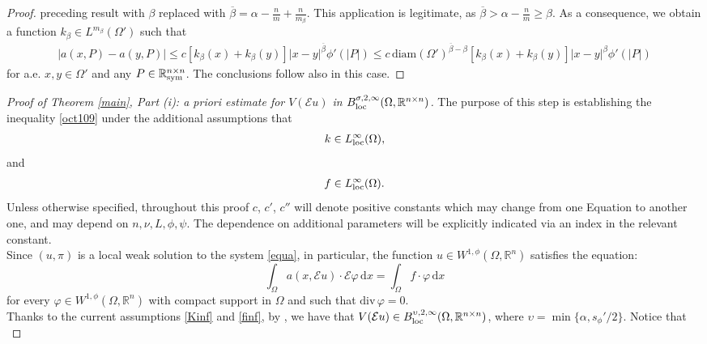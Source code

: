 \documentclass[leqno,11pt]{amsart}%
\numberwithin{equation}{section}
\newcommand{\dive}{\mathrm{div}\,}
\def\real{\mathbb R}
\def\R{\mathbb R}
\def\d{\mathrm{d}}
\def\E{\mathcal{E}}
\def\Sym{\real^{n\times n}_{\textup{sym}}}
\theoremstyle{definition}
\numberwithin{equation}{section}
\begin{document}
\begin{proof}
preceding result with $\beta$ replaced with $\overline\beta=\alpha-\frac{n}{
  m}+\frac{n}{ m_\beta}$. This application is legitimate, as 
  $\overline\beta> \alpha-\frac{n}{
  m}\ge\beta$. As a consequence, we obtain a function $k_\beta\in L^{
  m_\beta}(\Omega')$ such that
\begin{align*}
  |a(x,P)-a(y,P)|
  \le
  c [k_\beta(x)+k_\beta(y)]|x-y|^{\overline \beta}\phi'(|P|)\le c\,\mathrm{diam}(\Omega')^{\overline \beta -\beta}[k_\beta(x)+k_\beta(y)]|x-y|^{\beta}\phi'(|P|)
\end{align*}
for a.e. $x,y\in\Omega'$ and any $P\in\Sym$. The conclusions follow also in this case.
\end{proof}


\begin{proof}
    [Proof of Theorem \ref{main}, Part (i):  a priori estimate for $V(\E u)$ in $B^{\sigma, 2, \infty}_{\rm loc}(\Omega, \mathbb R^{n\times n})$] The purpose of this step is establishing the inequality \eqref{oct109} under the additional assumptions that 
    \begin{align}
        \label{Kinf}
        k\in L^\infty_{\rm loc}(\Omega),
    \end{align}
    and
        \begin{align}
        \label{finf}
        f\in L^\infty_{\rm loc}(\Omega).
    \end{align}
    Unless otherwise specified, throughout this proof $c$, $c'$, $c''$ will denote positive constants which  may change from one Equation to another one, and may depend on $n, \nu, L, \phi, \psi$.
  The dependence on additional parameters will be explicitly indicated via an index in the relevant constant.
 \\
    Since $(u,\pi)$ is a local weak solution to the system \eqref{equa}, in particular, the function $u\in
  W^{1,\phi}(\Omega,\R^n)$ satisfies the equation:
  \begin{equation}
    \label{equa-div-free}
    \int_\Omega  a(x,\E u)\cdot\E\varphi\,\d x
    =
    \int_\Omega f\cdot\varphi\,\d x
  \end{equation}
for every $\varphi\in W^{1,\phi}(\Omega,\R^n)$ with compact support in $\Omega$ and such that $\dive\varphi=0$.
\\ Thanks to the current assumptions \eqref{Kinf} and \eqref{finf}, by \cite[Theorem 1.2]{GPS}, we have that $ V(\mathcal E u)\in B^{\upsilon, 2, \infty}_{\rm loc}(\Omega, \mathbb R^{n\times n})$,
where $\upsilon = \min\{\alpha, s_\phi'/2\}$. Notice that 
\begin{equation}   \label{july24}

\end{equation}
\end{proof}
\end{document}
